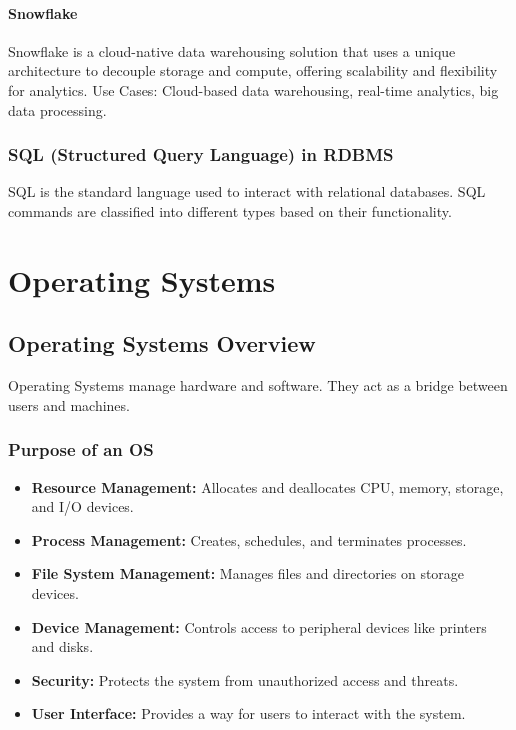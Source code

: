 \documentclass[openany]{book} %
\begin{document}
\subsection{Snowflake}
Snowflake is a cloud-native data warehousing solution that uses a unique architecture to decouple storage and compute, offering scalability and flexibility for analytics.
Use Cases: Cloud-based data warehousing, real-time analytics, big data processing.


\section{SQL (Structured Query Language) in RDBMS}
SQL is the standard language used to interact with relational databases. SQL commands are classified into different types based on their functionality.


\part {Operating Systems}

\chapter{Operating Systems Overview}

Operating Systems manage hardware and software. They act as a bridge between users and machines.

\section{Purpose of an OS}
\begin{itemize}
    \item \textbf{Resource Management:} Allocates and deallocates CPU, memory, storage, and I/O devices.
    \item \textbf{Process Management:} Creates, schedules, and terminates processes.
    \item \textbf{File System Management:} Manages files and directories on storage devices.
    \item \textbf{Device Management:} Controls access to peripheral devices like printers and disks.
    \item \textbf{Security:} Protects the system from unauthorized access and threats.
    \item \textbf{User Interface:} Provides a way for users to interact with the system.
\end{itemize}
\end{document}
